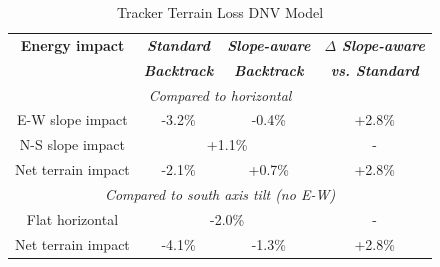 \documentclass[conference]{IEEEtran}
\begin{document}
\begin{table}[htbp]
\caption{Tracker Terrain Loss DNV Model}
\begin{center}
\begin{tabular}{|c|c|c|c|}
\hline
\textbf{Energy impact}& \textbf{\textit{Standard}}& \textbf{\textit{Slope-aware}}& \textbf{\textit{$\Delta$ Slope-aware}} \\
  & \textbf{\textit{Backtrack}} & \textbf{\textit{Backtrack}} & \textbf{\textit{vs. Standard}}\\
\hline
\multicolumn{4}{|c|}{\textit{Compared to horizontal}} \\
\hline
E-W slope impact & -3.2\% & -0.4\% & +2.8\% \\
\hline
N-S slope impact  & \multicolumn{2}{|c|}{+1.1\%}  & - \\
\hline
Net terrain impact & -2.1\% & +0.7\% & +2.8\% \\
\hline
\multicolumn{4}{|c|}{\textit{Compared to south axis tilt (no E-W)}} \\
\hline
Flat horizontal & \multicolumn{2}{|c|}{-2.0\%} & - \\
\hline
Net terrain impact & -4.1\% & -1.3\% & +2.8\%  \\
\hline
\end{tabular}
\label{table:uneven-terrain}
\end{center}
\end{table}
\end{document}
